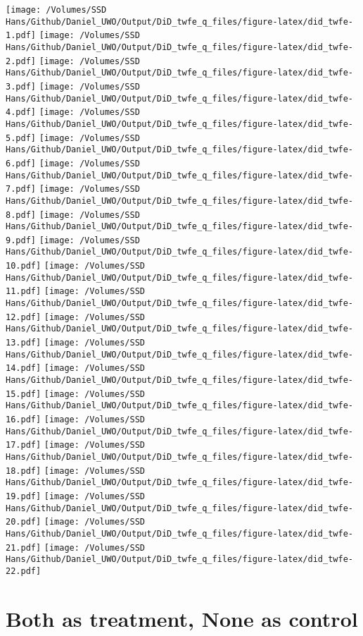 \documentclass[
]{article}
\begin{document}
\texttt{[image: /Volumes/SSD Hans/Github/Daniel\_UWO/Output/DiD\_twfe\_q\_files/figure-latex/did\_twfe-1.pdf]}
\texttt{[image: /Volumes/SSD Hans/Github/Daniel\_UWO/Output/DiD\_twfe\_q\_files/figure-latex/did\_twfe-2.pdf]}
\texttt{[image: /Volumes/SSD Hans/Github/Daniel\_UWO/Output/DiD\_twfe\_q\_files/figure-latex/did\_twfe-3.pdf]}
\texttt{[image: /Volumes/SSD Hans/Github/Daniel\_UWO/Output/DiD\_twfe\_q\_files/figure-latex/did\_twfe-4.pdf]}
\texttt{[image: /Volumes/SSD Hans/Github/Daniel\_UWO/Output/DiD\_twfe\_q\_files/figure-latex/did\_twfe-5.pdf]}
\texttt{[image: /Volumes/SSD Hans/Github/Daniel\_UWO/Output/DiD\_twfe\_q\_files/figure-latex/did\_twfe-6.pdf]}
\texttt{[image: /Volumes/SSD Hans/Github/Daniel\_UWO/Output/DiD\_twfe\_q\_files/figure-latex/did\_twfe-7.pdf]}
\texttt{[image: /Volumes/SSD Hans/Github/Daniel\_UWO/Output/DiD\_twfe\_q\_files/figure-latex/did\_twfe-8.pdf]}
\texttt{[image: /Volumes/SSD Hans/Github/Daniel\_UWO/Output/DiD\_twfe\_q\_files/figure-latex/did\_twfe-9.pdf]}
\texttt{[image: /Volumes/SSD Hans/Github/Daniel\_UWO/Output/DiD\_twfe\_q\_files/figure-latex/did\_twfe-10.pdf]}
\texttt{[image: /Volumes/SSD Hans/Github/Daniel\_UWO/Output/DiD\_twfe\_q\_files/figure-latex/did\_twfe-11.pdf]}
\texttt{[image: /Volumes/SSD Hans/Github/Daniel\_UWO/Output/DiD\_twfe\_q\_files/figure-latex/did\_twfe-12.pdf]}
\texttt{[image: /Volumes/SSD Hans/Github/Daniel\_UWO/Output/DiD\_twfe\_q\_files/figure-latex/did\_twfe-13.pdf]}
\texttt{[image: /Volumes/SSD Hans/Github/Daniel\_UWO/Output/DiD\_twfe\_q\_files/figure-latex/did\_twfe-14.pdf]}
\texttt{[image: /Volumes/SSD Hans/Github/Daniel\_UWO/Output/DiD\_twfe\_q\_files/figure-latex/did\_twfe-15.pdf]}
\texttt{[image: /Volumes/SSD Hans/Github/Daniel\_UWO/Output/DiD\_twfe\_q\_files/figure-latex/did\_twfe-16.pdf]}
\texttt{[image: /Volumes/SSD Hans/Github/Daniel\_UWO/Output/DiD\_twfe\_q\_files/figure-latex/did\_twfe-17.pdf]}
\texttt{[image: /Volumes/SSD Hans/Github/Daniel\_UWO/Output/DiD\_twfe\_q\_files/figure-latex/did\_twfe-18.pdf]}
\texttt{[image: /Volumes/SSD Hans/Github/Daniel\_UWO/Output/DiD\_twfe\_q\_files/figure-latex/did\_twfe-19.pdf]}
\texttt{[image: /Volumes/SSD Hans/Github/Daniel\_UWO/Output/DiD\_twfe\_q\_files/figure-latex/did\_twfe-20.pdf]}
\texttt{[image: /Volumes/SSD Hans/Github/Daniel\_UWO/Output/DiD\_twfe\_q\_files/figure-latex/did\_twfe-21.pdf]}
\texttt{[image: /Volumes/SSD Hans/Github/Daniel\_UWO/Output/DiD\_twfe\_q\_files/figure-latex/did\_twfe-22.pdf]}

\hypertarget{both-as-treatment-none-as-control}{%
\section{Both as treatment, None as
control}\label{both-as-treatment-none-as-control}}
\end{document}
